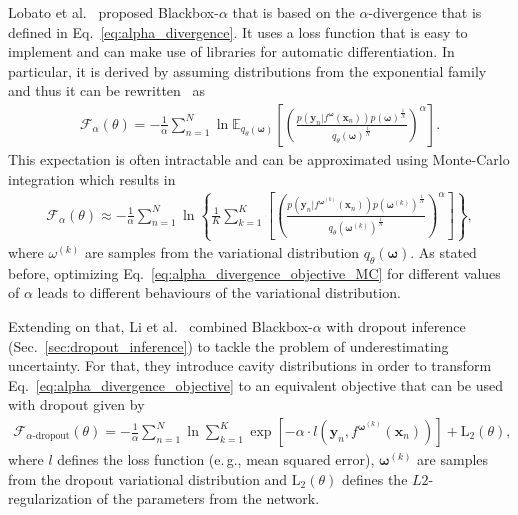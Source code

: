\documentclass[runningheads]{llncs}
\begin{document}
Lobato et al.~\cite{hernandez2016black} proposed Blackbox-$\alpha$ that is based on the $\alpha$-divergence that is defined in
Eq.~\ref{eq:alpha_divergence}.
It uses a loss function that is easy to implement and can make use of libraries for automatic differentiation.
In particular, it is derived by assuming distributions from the exponential family and thus it can be rewritten~\cite{li2017dropout} as
\begin{align}
\mathcal{F}_\alpha (\theta) = - \frac{1}{\alpha} \sum_{n =1}^N \ln\mathbb{E}_{q_\theta(\mathbf{\omega})}\left[ \left( \frac{p(\mathbf{y}_n| f^{\boldsymbol{\omega}}(\mathbf{x}_n))p(\boldsymbol{\omega})^\frac{1}{N}}{q_\theta(\boldsymbol{\omega})^\frac{1}{N}}\right)^\alpha\right].\label{eq:alpha_divergence_objective}
\end{align}
This expectation is often intractable and can be approximated using Monte-Carlo integration which results in
\begin{align}
\mathcal{F}_\alpha (\theta) \approx - \frac{1}{\alpha} \sum_{n =1}^N \ln \left\{ \frac{1}{K}\sum_{k=1}^K
\left[ \left( \frac{p(\mathbf{y}_n| f^{\boldsymbol{\omega}^{(k)}}(\mathbf{x}_n))p(\boldsymbol{\omega}^{(k)})^\frac{1}{N}}{q_\theta(\boldsymbol{\omega}^{(k)})^\frac{1}{N}}\right)^\alpha\right]\right\},\label{eq:alpha_divergence_objective_MC}
\end{align}
where $\omega^{(k)}$ are samples from the variational distribution $q_\theta(\boldsymbol{\omega})$.
As stated before, optimizing Eq.~\ref{eq:alpha_divergence_objective_MC} for different values of $\alpha$ leads to different behaviours of the variational distribution.

Extending on that, Li et al.~\cite{li2017dropout} combined Blackbox-$\alpha$ with dropout inference (Sec.~\ref{sec:dropout_inference}) to tackle the problem of underestimating uncertainty.
For that, they introduce cavity distributions in order to transform Eq.~\ref{eq:alpha_divergence_objective} to an equivalent objective that can be used with dropout given by
\begin{align}
    \mathcal{F}_{\alpha\text{-dropout}}(\theta) = -\frac{1}{\alpha} \sum_{n=1}^N \ln \sum_{k=1}^{K}\exp\left[-\alpha \cdot l\left(\mathbf{y}_n, f^{\boldsymbol{\omega}^{(k)}} (\mathbf{x}_n)\right) \right] + \mathrm{L}_2(\theta), \label{eq:dropout_alpha_divergence}
\end{align}
where $l$ defines the loss function (e.\,g., mean squared error), $\boldsymbol{\omega}^{(k)}$ are samples from the dropout variational distribution and $\mathrm{L}_2(\theta)$ defines the $L2$-regularization of the parameters from the network.
\end{document}
